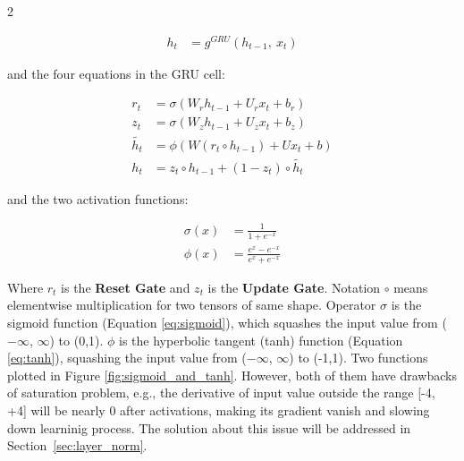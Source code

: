 \begin{multicols}{2}

\begin{align}
    h_t &= g^{GRU} \left(  h_{t-1}, \ x_t  \right)
\end{align}

\noindent and the four equations in the GRU cell:

\begin{align}
        r_t &=  \sigma (W_r h_{t-1} + U_r x_t + b_r) \label{eq:reset_gate} \\
        z_t &= \sigma (W_z h_{t-1} + U_z x_t + b_z) \label{eq:update_gate} \\
        \tilde{h_t} &= \phi(W (r_t \circ h_{t-1}) + U x_t + b) \label{eq:h_hat} \\
        h_t &= z_t \circ h_{t-1} + (1-z_t) \circ \tilde{h_t} \label{eq:h_out}
\end{align}

\noindent and the two activation functions:

\begin{align}
    \sigma (x) &= \frac{1}{1+e^{-x}} \label{eq:sigmoid} \\
    \phi (x) &= \frac{ e^{x}-e^{-x} }{ e^{x}+e^{-x} } \label{eq:tanh}
\end{align}

Where $r_t$ is the \textbf{Reset Gate} and $z_t$ is the \textbf{Update Gate}.
Notation $\circ$ means elementwise multiplication for two tensors of same shape.
Operator $\sigma$ is the sigmoid function (Equation \ref{eq:sigmoid}), which squashes the input value from ($-\infty$, $\infty$) to (0,1).
$\phi$ is the hyperbolic tangent (tanh) function (Equation \ref{eq:tanh}), squashing the input value from ($-\infty$, $\infty$) to (-1,1).
Two functions plotted in Figure \ref{fig:sigmoid_and_tanh}.
However, both of them have drawbacks of saturation problem, e.g., the derivative of input value outside the range [-4, +4] will be nearly 0 after activations, 
making its gradient vanish and slowing down learninig process.
The solution about this issue will be addressed in Section~\ref{sec:layer_norm}.
\end{multicols}

